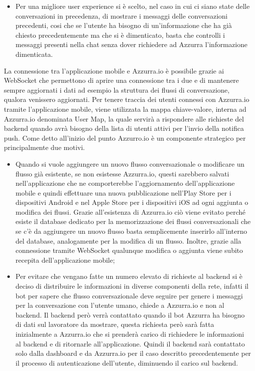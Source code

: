 \begin{trivlist}
\begin{itemize}
		\item Per una migliore user experience si è scelto, nel caso in cui ci siano state delle conversazioni in precedenza, di mostrare i messaggi delle conversazioni precedenti, cosi che se l'utente ha bisogno di un’informazione  che ha già chiesto precedentemente ma che si è dimenticato, basta che controlli i messaggi presenti nella chat senza dover richiedere ad Azzurra l'informazione dimenticata.
	\end{itemize}
	La connessione tra l'applicazione mobile e Azzurra.io è possibile grazie ai WebSocket che permettono di aprire una connessione tra i due e di mantenere sempre aggiornati i dati ad esempio la struttura dei flussi di conversazione, qualora venissero aggiornati. Per tenere traccia dei utenti connessi con Azzurra.io tramite l'applicazione mobile, viene utilizzata la mappa chiave-valore, interna ad Azzurra.io denominata User Map, la quale servirà a rispondere alle richieste del backend quando avrà bisogno della lista di utenti attivi per l'invio della notifica push. Come detto all'inizio del punto Azzurro.io è un componente strategico per principalmente due motivi.
	\begin{itemize}
		\item Quando si vuole aggiungere un nuovo flusso conversazionale o modificare un flusso già esistente, se non esistesse Azzurra.io, questi sarebbero salvati nell'applicazione che ne comporterebbe l'aggiornamento dell'applicazione mobile e quindi effettuare una nuova pubblicazione nell'Play Store per i dispositivi Android e nel Apple Store per i dispositivi iOS ad ogni aggiunta o modifica dei flussi. Grazie all'esistenza di Azzurra.io ciò viene evitato perché esiste il database dedicato per la memorizzazione dei flussi conversazionali che se c'è da aggiungere un nuovo flusso basta semplicemente inserirlo all'interno del database, analogamente per la modifica di un flusso. Inoltre, grazie alla connessione tramite WebSocket qualunque modifica o aggiunta viene subito recepita dell'applicazione mobile;
		\item Per evitare che vengano fatte un numero elevato di richieste al backend si è deciso di distribuire le informazioni in diverse componenti della rete, infatti il bot per sapere che flusso conversazionale deve seguire per genere i messaggi per la conversazione con l'utente umano, chiede a Azzurra.io e non al backend. Il backend però verrà contattato quando il bot Azzurra ha bisogno di dati sul lavoratore da mostrare, questa richiesta però sarà fatta inizialmente a Azzurra.io che si prenderà carico di richiedere le informazioni al backend e di ritornarle all'applicazione. Quindi il backend sarà contattato solo dalla dashboard e da Azzurra.io per il caso descritto precedentemente per il processo di autenticazione dell'utente, diminuendo il carico sul backend.
	\end{itemize}
	

\end{trivlist}
